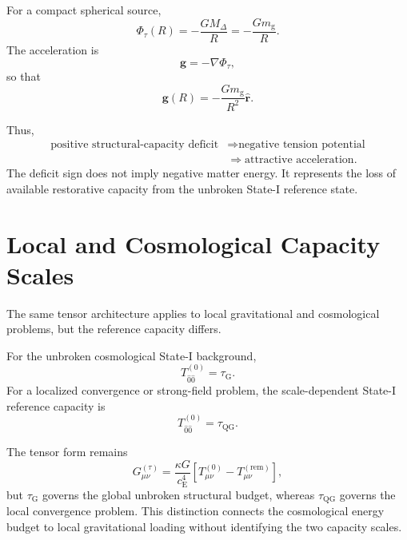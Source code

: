 For a compact spherical source,
\begin{equation}
    \Phi_\tau(R) = -\frac{GM_{\Delta}}{R} = -\frac{Gm_{\mathrm{g}}}{R}.
\end{equation}
The acceleration is
\begin{equation}
    \mathbf{g} = -\nabla\Phi_\tau,
\end{equation}
so that
\begin{equation}
    \mathbf{g}(R) = -\frac{Gm_{\mathrm{g}}}{R^2} \hat{\mathbf{r}}.
\end{equation}

Thus,
\begin{equation}
    \begin{aligned}
    \text{positive structural-capacity deficit} &\Longrightarrow \text{negative tension potential} \\
    &\Longrightarrow \text{attractive acceleration}.
    \end{aligned}
\end{equation}
The deficit sign does not imply negative matter energy. It represents the loss of available restorative capacity from the unbroken State-I reference state.

\section{Local and Cosmological Capacity Scales}

The same tensor architecture applies to local gravitational and cosmological problems, but the reference capacity differs.

For the unbroken cosmological State-I background,
\begin{equation}
    T_{\hat{0}\hat{0}}^{(0)} = \tau_{\mathrm{G}}.
\end{equation}
For a localized convergence or strong-field problem, the scale-dependent State-I reference capacity is
\begin{equation}
    T_{\hat{0}\hat{0}}^{(0)} = \tau_{\mathrm{QG}}.
\end{equation}

The tensor form remains
\begin{equation}
    G_{\mu\nu}^{(\tau)} = \frac{\kappa G}{c_{\mathrm{E}}^4} \left[ T_{\mu\nu}^{(0)} - T_{\mu\nu}^{(\mathrm{rem})} \right],
\end{equation}
but $\tau_{\mathrm{G}}$ governs the global unbroken structural budget, whereas $\tau_{\mathrm{QG}}$ governs the local convergence problem. This distinction connects the cosmological energy budget to local gravitational loading without identifying the two capacity scales.

